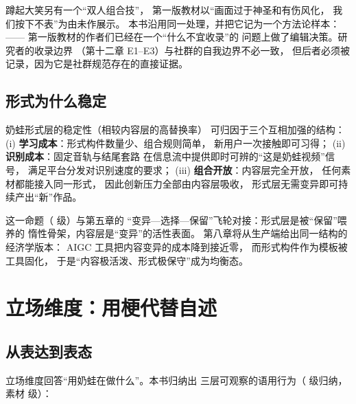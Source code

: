 蹲起大笑另有一个“双人组合技”，
第一版教材以“画面过于神圣和有伤风化，
我们按下不表”为由未作展示。
本书沿用同一处理，并把它记为一个方法论样本：
——
第一版教材的作者们已经在一个“什么不宜收录”的
问题上做了编辑决策。研究者的收录边界
（第十二章 E1--E3）与社群的自我边界不必一致，
但后者必须被记录，因为它是社群规范存在的直接证据。

\subsection{形式为什么稳定}

\begin{proposition}\label{prop:06:formstable}
  奶蛙形式层的稳定性（相较内容层的高替换率）
  可归因于三个互相加强的结构：
  (i) \textbf{学习成本}：形式构件数量少、组合规则简单，
  新用户一次接触即可习得；
  (ii) \textbf{识别成本}：固定音轨与结尾套路
  在信息流中提供即时可辨的“这是奶蛙视频”信号，
  满足平台分发对识别速度的要求；
  (iii) \textbf{组合开放}：内容层完全开放，
  任何素材都能接入同一形式，
  因此创新压力全部由内容层吸收，
  形式层无需变异即可持续产出“新”作品。
\end{proposition}

这一命题（ 级）与第五章的
“变异—选择—保留”飞轮对接：形式层是被“保留”喂养的
惰性骨架，内容层是“变异”的活性表面。
第八章将从生产端给出同一结构的经济学版本：
AIGC 工具把内容变异的成本降到接近零，
而形式构件作为模板被工具固化，
于是“内容极活泼、形式极保守”成为均衡态。

\section{立场维度：用梗代替自述}\label{sec:06:stance}

\subsection{从表达到表态}

立场维度回答“用奶蛙在做什么”。本书归纳出
三层可观察的语用行为（ 级归纳，
素材  级）：

